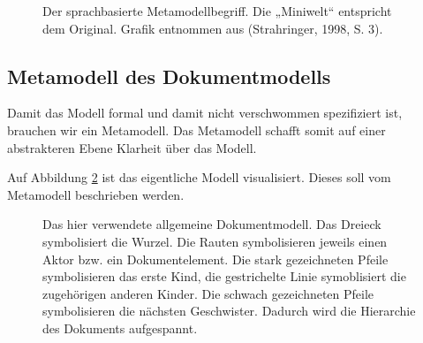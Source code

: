  
\begin{figure}[h!]
\centering
\advance\leftskip-2.5cm
\caption[Der sprachbasierte Metamodellbegriff]{ Der sprachbasierte Metamodellbegriff. Die „Miniwelt“ entspricht dem Original. Grafik entnommen aus (Strahringer, 1998, S. 3). }\label{metamodellbegriff}
\end{figure}
 
\subsection{Metamodell des Dokumentmodells}\label{metamodell_dokument}
 
Damit das Modell formal und damit nicht verschwommen spezifiziert ist, brauchen wir ein Metamodell. Das Metamodell schafft somit auf einer abstrakteren Ebene Klarheit über das Modell.

 
Auf Abbildung \ref{docmodell} ist das eigentliche Modell visualisiert. Dieses soll vom Metamodell beschrieben werden.

 
\begin{figure}[h!]
\centering
\advance\leftskip-2.5cm
\caption[Allgemeines Dokumentmodell]{ Das hier verwendete allgemeine Dokumentmodell. Das Dreieck symbolisiert die Wurzel. Die Rauten symbolisieren jeweils einen Aktor bzw. ein Dokumentelement. Die stark gezeichneten Pfeile symbolisieren das erste Kind, die gestrichelte Linie symoblisiert die zugehörigen anderen Kinder. Die schwach gezeichneten Pfeile symbolisieren die nächsten Geschwister. Dadurch wird die Hierarchie des Dokuments aufgespannt. }\label{docmodell}
\end{figure}
 
